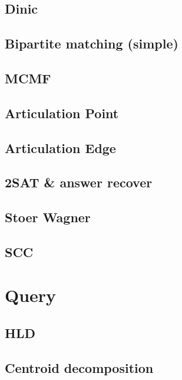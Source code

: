 \documentclass[10pt,landscape,a4paper,twocolumn]{article}
\begin{document}
\subsection{Dinic}


\subsection{Bipartite matching (simple)}


\subsection{MCMF}


\subsection{Articulation Point}


\subsection{Articulation Edge}


\subsection{2SAT \& answer recover}


\subsection{Stoer Wagner}


\subsection{SCC}
%
\section{Query}
\subsection{HLD}


\subsection{Centroid decomposition}

\end{document}

